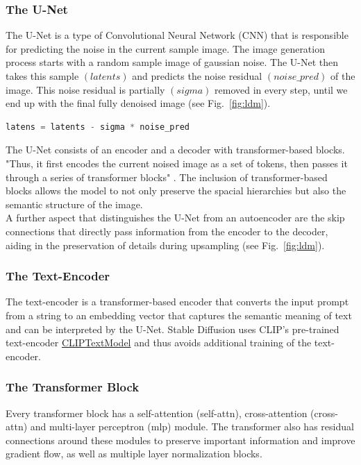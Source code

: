 \subsubsection{The U-Net}
The U-Net \cite{ronneberger2015u} is a type of Convolutional Neural Network (CNN) that is responsible for predicting the noise in the current sample image. The image generation process starts with a random sample image of gaussian noise. The U-Net then takes this sample \((latents)\) and predicts the noise residual \((noise\_pred)\) of the image. 
This noise residual is partially \((sigma)\) removed in every step, until we end up with the final fully denoised image (see Fig.~\ref{fig:ldm}).
\begin{lstlisting}[language=Python]
latens = latents - sigma * noise_pred
\end{lstlisting}
The U-Net consists of an encoder and a decoder with transformer-based blocks. "Thus, it first encodes the current noised image as a set of tokens, then passes it through a series of transformer blocks" \cite{bolya2023tomesd}. The inclusion of transformer-based blocks allows the model to not only preserve the spacial hierarchies but also the semantic structure of the image.\\
A further aspect that distinguishes the U-Net from an autoencoder are the skip connections that directly pass information from the encoder to the decoder, aiding in the preservation of details during upsampling (see Fig.~\ref{fig:ldm}).



\subsubsection{The Text-Encoder}
The text-encoder is a transformer-based encoder that converts the input prompt from a string to an embedding vector that captures the semantic meaning of text and can be interpreted by the U-Net. Stable Diffusion uses CLIP's \cite{radford2021learning} pre-trained text-encoder \href{https://huggingface.co/docs/transformers/model_doc/clip#transformers.CLIPTextModel}{CLIPTextModel} and thus avoids additional training of the text-encoder.



\subsubsection{The Transformer Block}
Every transformer block has a self-attention (self-attn), cross-attention (cross-attn) and multi-layer perceptron (mlp) module.
The transformer also has residual connections around these modules to preserve important information and improve gradient flow, as well as multiple layer normalization blocks.



